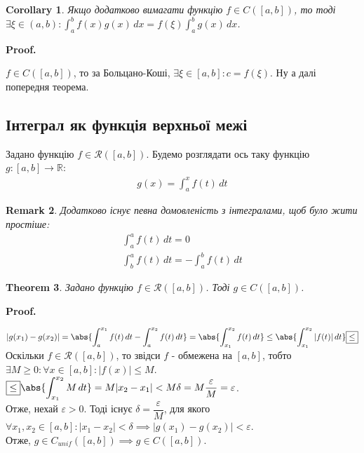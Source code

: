 \documentclass[a4paper, 10pt]{article}
\makeatletter
\def\huge{\displaystyle}
\def\qed{$\blacksquare$}
\theoremstyle{theoremdd}
\newtheorem{theorem}{Theorem}[subsection]
\theoremstyle{theoremdd}
\theoremstyle{theoremdd}
\theoremstyle{theoremdd}
\theoremstyle{theoremdd}
\theoremstyle{theoremdd}
\theoremstyle{theoremdd}
\newtheorem{remark}[theorem]{Remark}
\theoremstyle{theoremdd}
\theoremstyle{theoremdd}
\newtheorem{corollary}[theorem]{Corollary}
\renewenvironment{proof}[1][Proof.\\]{\par
\pushQED{\hfill \qed}%
\normalfont \topsep6\p@\@plus6\p@\relax
\trivlist
\item\relax
{\bfseries
#1\@addpunct{.}}\hspace\labelsep\ignorespaces
}{%
\popQED\endtrivlist\@endpefalse
}
\makeatother
\begin{document}
\begin{corollary}
Якщо додатково вимагати функцію $f \in C([a,b])$, то тоді \\ $\exists \xi \in (a,b): \huge\int_a^b f(x)g(x)\,dx = f(\xi) \int_a^b g(x)\,dx$.
\end{corollary}

\begin{proof}
$f \in C([a,b])$, то за Больцано-Коші, $\exists \xi \in [a,b]: c = f(\xi)$. Ну а далі попередня теорема.
\end{proof}

\subsection{Інтеграл як функція верхньої межі}
Задано функцію $f \in \mathcal{R}([a,b])$. Будемо розглядати ось таку функцію $g: [a,b] \to \mathbb{R}$:
\begin{align*}
g(x) = \int_a^x f(t)\,dt
\end{align*}

\begin{remark}
Додатково існує певна домовленість з інтегралами, щоб було жити простіше:
\begin{align*}
\int_a^a f(t)\,dt = 0 \\
\int_b^a f(t)\,dt = -\int_a^b f(t)\,dt
\end{align*}
\end{remark}

\begin{theorem}
Задано функцію $f \in \mathcal{R}([a,b])$. Тоді $g \in C([a,b])$.
\end{theorem}

\begin{proof}
$|g(x_1)-g(x_2)| = \huge \abs{\int_a^{x_1} f(t)\,dt - \int_a^{x_2} f(t)\,dt} = \abs{\int_{x_1}^{x_2} f(t)\,dt} \leq \abs{\int_{x_1}^{x_2} |f(t)|\,dt} \boxed{\leq}$\\
Оскільки $f \in \mathcal{R}([a,b])$, то звідси $f$ - обмежена на $[a,b]$, тобто $\exists M \geq 0: \forall x \in [a,b]: |f(x)| \leq M$.\\
$\boxed{\leq} \abs{\huge\int_{x_1}^{x_2} M \,dt} = M |x_2-x_1| < M \delta = M \dfrac{\varepsilon}{M} = \varepsilon$.\\
Отже, нехай $\varepsilon > 0$. Тоді існує $\delta = \dfrac{\varepsilon}{M}$, для якого $\forall x_1,x_2 \in [a,b]: |x_1-x_2| < \delta \implies |g(x_1)-g(x_2)| < \varepsilon$.\\
Отже, $g \in C_{unif}([a,b]) \implies g \in C([a,b])$.
\end{proof}
\end{document}
